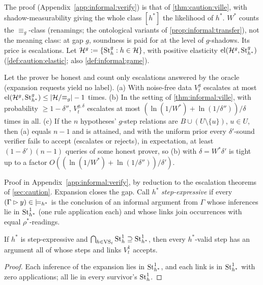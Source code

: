 The proof (Appendix~\ref{app:informal:verify}) is that of \cref{thm:caution:ville}, with shadow-measurability giving the whole class $[h^*]$ the likelihood of $h^*$. $W^*$ counts the $\equiv_g$-class (renamings; the ontological variants of \cref{prop:informal:transfer}), not the meaning class: at gap $g$, soundness is paid for at the level of $g$-shadows. Its price is escalations. Let $\mathcal{H}^g:=\{\mathrm{St}^{g}_{h}:h\in\mathcal{H}\}$, with positive elasticity $\mathrm{el}(\mathcal{H}^g,\mathrm{St}^{g}_{h^*})$ (\cref{def:caution:elastic}; also \cref{def:informal:game}).

\begin{theorem}\label{thm:informal:escalation}
Let the prover be honest and count only escalations answered by the oracle (expansion requests yield no label). (a) With noise-free data $V^g_t$ escalates at most $\mathrm{el}(\mathcal{H}^g,\mathrm{St}^{g}_{h^*})\le|\mathcal{H}/{\equiv_g}|-1$ times. (b) In the setting of \cref{thm:informal:ville}, with probability $\ge1-\delta''$, $V^{g,\delta}_t$ escalates at most $(\ln(1/W^*)+\ln(1/\delta''))/\delta$ times in all. (c) If the $n$ hypotheses' $g$-step relations are $B\cup(U\setminus\{u\})$, $u\in U$, then (a) equals $n-1$ and is attained, and with the uniform prior every $\delta'$-sound verifier fails to accept (escalates or rejects), in expectation, at least $(1-\delta')(n-1)$ queries of some honest prover, so (b) with $\delta=W^*\delta'$ is tight up to a factor $O((\ln(1/W^*)+\ln(1/\delta''))/\delta')$.
\end{theorem}

Proof in Appendix~\ref{app:informal:verify}, by reduction to the escalation theorems of \cref{sec:caution}. Expansion closes the gap. Call $h^*$ \emph{step-expressive} if every $(\Gamma\rhd y)\in{\models_{h^*}}$ is the conclusion of an informal argument from $\Gamma$ whose inferences lie in $\mathrm{St}^{1}_{h^*}$ (one rule application each) and whose links join occurrences with equal $\rho^*$-readings.

\begin{proposition}\label{prop:informal:expansion}
If $h^*$ is step-expressive and $\bigcap_{h\in\mathrm{VS}_t}\mathrm{St}^{1}_{h}\supseteq\mathrm{St}^{1}_{h^*}$, then every $h^*$-valid step has an argument all of whose steps and links $V^1_t$ accepts.
\end{proposition}

\begin{proof}
Each inference of the expansion lies in $\mathrm{St}^{1}_{h^*}$, and each link is in $\mathrm{St}^{1}_{h^*}$ with zero applications; all lie in every survivor's $\mathrm{St}^{1}_{h}$.
\end{proof}

